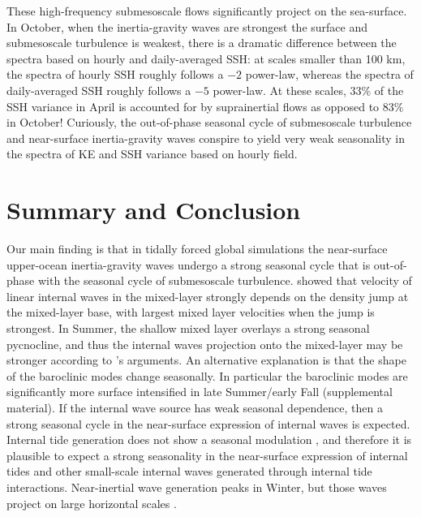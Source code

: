 \documentclass[grl]{agutex2015}
\begin{document}
\begin{article}
These high-frequency submesoscale flows significantly project on the sea-surface.
In October, when the inertia-gravity waves are strongest the surface and submesoscale
turbulence is weakest, there is a dramatic difference between the spectra
based on hourly and daily-averaged SSH: at scales smaller than 100 km, the spectra
of hourly SSH roughly follows a $-2$ power-law, whereas the spectra of daily-averaged
SSH roughly follows a $-5$ power-law. At these scales, 33$\%$ of the SSH variance in April is accounted for by suprainertial
flows as opposed to 83$\%$ in October! Curiously, the out-of-phase seasonal cycle of submesoscale
turbulence and near-surface inertia-gravity waves conspire to yield very weak seasonality
in the spectra of KE and SSH variance based on hourly field.


\section{Summary and Conclusion}
Our main finding is that in tidally forced global simulations the
near-surface upper-ocean inertia-gravity waves undergo
a strong seasonal cycle that is out-of-phase with the seasonal cycle of
submesoscale turbulence. \cite{dasaro1978} showed that velocity of linear internal waves
in the mixed-layer strongly depends on the density jump at the mixed-layer
base, with largest mixed layer velocities when the jump is strongest.
In Summer, the shallow mixed layer overlays a strong seasonal pycnocline,
and thus the internal waves projection onto the mixed-layer may be stronger
according to \cite{dasaro1978}'s arguments. An
alternative explanation is that the shape of the baroclinic modes
change seasonally. In particular the baroclinic modes are
significantly more surface intensified in late Summer/early Fall
 (supplemental material).
If the internal wave source has weak seasonal dependence, then a strong
seasonal cycle in the near-surface expression of internal waves is expected.
Internal tide generation does not show a seasonal modulation \citep[e.g.,][]{alford2003},
and therefore it is plausible to expect a strong seasonality in the near-surface
expression of internal tides and
other small-scale internal waves generated through internal tide interactions.
Near-inertial wave generation peaks in Winter, but those waves project on large
horizontal scales \citep[e.g, ][]{qi_etal1995}.


\end{article}
\end{document}
